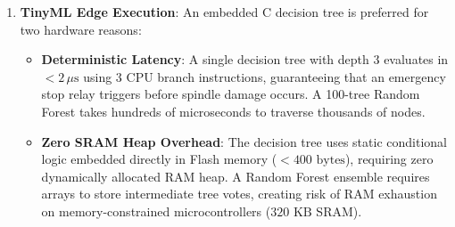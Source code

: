 \begin{enumerate}
    \item \textbf{TinyML Edge Execution}:
    An embedded C decision tree is preferred for two hardware reasons:
    \begin{itemize}
        \item \textbf{Deterministic Latency}: A single decision tree with depth 3 evaluates in $< 2\,\mu\text{s}$ using 3 CPU branch instructions, guaranteeing that an emergency stop relay triggers before spindle damage occurs. A 100-tree Random Forest takes hundreds of microseconds to traverse thousands of nodes.
        \item \textbf{Zero SRAM Heap Overhead}: The decision tree uses static conditional logic embedded directly in Flash memory ($< 400\text{ bytes}$), requiring zero dynamically allocated RAM heap. A Random Forest ensemble requires arrays to store intermediate tree votes, creating risk of RAM exhaustion on memory-constrained microcontrollers ($320\text{ KB}$ SRAM).
    \end{itemize}
\end{enumerate}